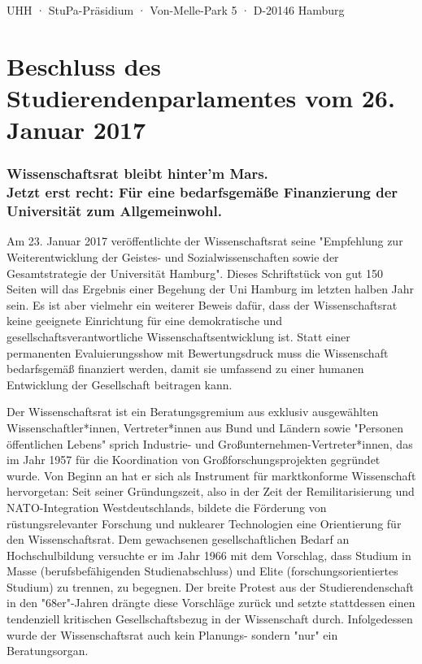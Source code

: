 \documentclass[ngerman,headheight=70pt]{scrartcl}
\begin{document}
    UHH · StuPa-Präsidium · Von-Melle-Park 5 · D-20146 Hamburg

    \section*{Beschluss des Studierendenparlamentes vom 26. Januar 2017}
    \subsubsection*{Wissenschaftsrat bleibt hinter'm Mars.\\
    Jetzt erst recht: Für eine bedarfsgemäße Finanzierung der
    Universität zum Allgemeinwohl.}

    Am 23. Januar 2017 veröffentlichte der Wissenschaftsrat seine "Empfehlung
    zur Weiterentwicklung der Geistes- und Sozialwissenschaften sowie der
    Gesamtstrategie der Universität Hamburg". Dieses Schriftstück von gut 150
    Seiten will das Ergebnis einer Begehung der Uni Hamburg im letzten halben
    Jahr sein. Es ist aber vielmehr ein weiterer Beweis dafür, dass der
    Wissenschaftsrat keine geeignete Einrichtung für eine demokratische und
    gesellschaftsverantwortliche Wissenschaftsentwicklung ist. Statt einer
    permanenten Evaluierungsshow mit Bewertungsdruck muss die Wissenschaft
    bedarfsgemäß finanziert werden, damit sie umfassend zu einer humanen
    Entwicklung der Gesellschaft beitragen kann.

    Der Wissenschaftsrat ist ein Beratungsgremium aus exklusiv ausgewählten
    Wissenschaftler*innen, Vertreter*innen aus Bund und Ländern sowie "Personen
    öffentlichen Lebens" sprich Industrie- und Großunternehmen-Vertreter*innen,
    das im Jahr 1957 für die Koordination von Großforschungsprojekten gegründet
    wurde. Von Beginn an hat er sich als Instrument für marktkonforme Wissenschaft
    hervorgetan: Seit seiner Gründungszeit, also in der Zeit der Remilitarisierung
    und NATO-Integration Westdeutschlands, bildete die Förderung von rüstungsrelevanter
    Forschung und nuklearer Technologien eine Orientierung für den Wissenschaftsrat.
    Dem gewachsenen gesellschaftlichen Bedarf an Hochschulbildung versuchte er im
    Jahr 1966 mit dem Vorschlag, dass Studium in Masse (berufsbefähigenden
    Studienabschluss) und Elite (forschungsorientiertes Studium) zu trennen, zu
    begegnen. Der breite Protest aus der Studierendenschaft in den "68er"-Jahren
    drängte diese Vorschläge zurück und setzte stattdessen einen tendenziell
    kritischen Gesellschaftsbezug in der Wissenschaft durch. Infolgedessen wurde
    der Wissenschaftsrat auch kein Planungs- sondern "nur" ein Beratungsorgan.
\end{document}
